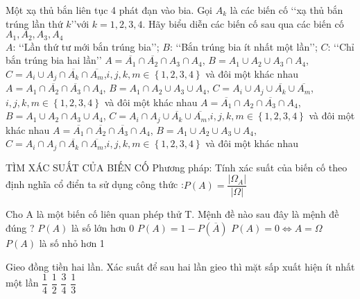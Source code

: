 \begin{ex}
Một xạ thủ bắn liên tục 4 phát đạn vào bia. Gọi $A_k$ là các biến cố \lq\lq  xạ thủ bắn trúng lần thứ $k$\rq\rq  với $k=1{,}2,3{,}4$. Hãy biểu diễn các biến cố sau qua các biến cố $A_1,A_2,A_3,A_4$\\
$A$: \lq\lq Lần thứ tư mới bắn trúng bia’’; $B$: \lq\lq Bắn trúng bia ít nhất một lần’’; $C$: \lq\lq  Chỉ bắn trúng bia hai lần’’
\choice
{$A=\overline{A_1}\cap \overline{A_2}\cap A_3\cap A_4$, $B=A_1\cup A_2\cup A_3\cap A_4$, $C=A_i\cup A_j\cap \overline{A_k}\cap \overline{A_m}$,$i,j,k,m\in \left\{ 1{,}2,3{,}4 \right\}$ và đôi một khác nhau}
{$A=A_1\cap \overline{A_2}\cap \overline{A_3}\cap A_4$, $B=A_1\cap A_2\cup A_3\cup A_4$, $C=A_i\cup A_j\cup \overline{A_k}\cup \overline{A_m}$,$i,j,k,m\in \left\{ 1{,}2,3{,}4 \right\}$ và đôi một khác nhau}
{$A=\overline{A_1}\cap A_2\cap \overline{A_3}\cap A_4$, $B=A_1\cup A_2\cap A_3\cup A_4$, $C=A_i\cap A_j\cup \overline{A_k}\cup \overline{A_m}$,$i,j,k,m\in \left\{ 1{,}2,3{,}4 \right\}$ và đôi một khác nhau}
{\True $A=\overline{A_1}\cap \overline{A_2}\cap \overline{A_3}\cap A_4$, $B=A_1\cup A_2\cup A_3\cup A_4$, $C=A_i\cap A_j\cap \overline{A_k}\cap \overline{A_m}$,$i,j,k,m\in \left\{ 1{,}2,3{,}4 \right\}$ và đôi một khác nhau}
\end{ex}
\begin{dang}{TÌM XÁC SUẤT CỦA BIẾN CỐ}
Phương pháp: Tính xác suất của biến cố theo định nghĩa cổ điển ta sử dụng công thức :$P(A)=\dfrac{|\Omega_A|}{|\Omega|}$
\end{dang}
\begin{ex}
Cho A là một biến cố liên quan phép thử T. Mệnh đề nào sau đây là mệnh đề đúng ?
\choice
{$P(A)$ là số lớn hơn 0}
{\True $P(A)=1-P\left(\overline{A}\right)$}
{$P(A)=0\Leftrightarrow A=\Omega $}
{$P(A)$ là số nhỏ hơn 1}
\end{ex}
\begin{ex}
Gieo đồng tiền hai lần. Xác suất để sau hai lần gieo thì mặt sấp xuất hiện ít nhất một lần
\choice
{$\dfrac{1}{4}$}
{$\dfrac{1}{2}$}
{\True $\dfrac{3}{4}$}
{$\dfrac{1}{3}$}
\end{ex}
